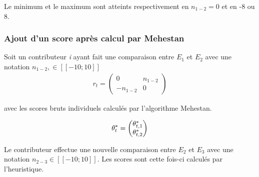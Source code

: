 Le minimum et le maximum sont atteints respectivement en $n_{1-2}=0$ et en -8 ou 8.


\subsubsection{Ajout d'un score après calcul par Mehestan}


Soit un contributeur \textit{i} ayant fait une comparaison entre $E_{1}$ et $E_{2}$ avec une notation $n_{1-2}, \in [\![-10;10]\!]$
\begin{align*}
r_{t}= \begin{pmatrix}
0 & n_{1-2} \\
-n_{1-2} & 0 
\end{pmatrix}    
\end{align*}

avec les scores bruts individuels calculés par l'algorithme Mehestan.

\begin{align*}
 \theta^*_{t}= \begin{pmatrix}
\theta^*_{t,1} \\
\theta^*_{t,2} 
\end{pmatrix}   
\end{align*}

Le contributeur effectue une nouvelle comparaison entre $E_{2}$ et $E_{3}$ avec une notation $n_{2-3} \in [\![-10;10]\!]$. Les scores sont cette fois-ci calculés par l'heuristique.

